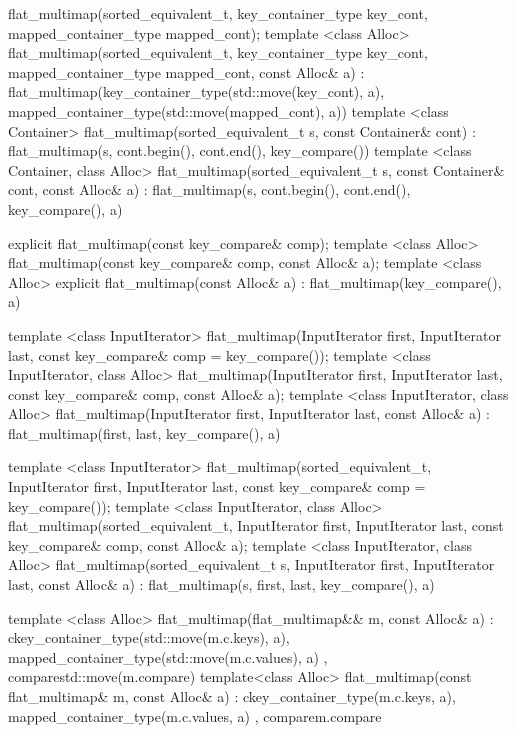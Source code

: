 \begin{codeblock}
\begin{codeblock}
\begin{codeblock}
\begin{addedblock}
\begin{codeblock}
{{      flat_multimap(sorted_equivalent_t,
                    key_container_type key_cont, mapped_container_type mapped_cont);
      template <class Alloc>
      flat_multimap(sorted_equivalent_t, key_container_type key_cont,
                    mapped_container_type mapped_cont, const Alloc& a)
          : flat_multimap(key_container_type(std::move(key_cont), a),
                          mapped_container_type(std::move(mapped_cont), a))
        { }
      template <class Container>
        flat_multimap(sorted_equivalent_t s, const Container& cont)
          : flat_multimap(s, cont.begin(), cont.end(), key_compare()) { }
      template <class Container, class Alloc>
        flat_multimap(sorted_equivalent_t s, const Container& cont, const Alloc& a)
          : flat_multimap(s, cont.begin(), cont.end(), key_compare(), a) { }

      explicit flat_multimap(const key_compare& comp);
      template <class Alloc>
        flat_multimap(const key_compare& comp, const Alloc& a);
      template <class Alloc>
        explicit flat_multimap(const Alloc& a)
          : flat_multimap(key_compare(), a) { }

      template <class InputIterator>
        flat_multimap(InputIterator first, InputIterator last,
                      const key_compare& comp = key_compare());
      template <class InputIterator, class Alloc>
        flat_multimap(InputIterator first, InputIterator last,
                     const key_compare& comp, const Alloc& a);
      template <class InputIterator, class Alloc>
        flat_multimap(InputIterator first, InputIterator last,
                      const Alloc& a)
          : flat_multimap(first, last, key_compare(), a) { }

      template <class InputIterator>
        flat_multimap(sorted_equivalent_t, InputIterator first, InputIterator last,
                      const key_compare& comp = key_compare());
      template <class InputIterator, class Alloc>
        flat_multimap(sorted_equivalent_t, InputIterator first, InputIterator last,
                      const key_compare& comp, const Alloc& a);
      template <class InputIterator, class Alloc>
        flat_multimap(sorted_equivalent_t s, InputIterator first, InputIterator last,
                      const Alloc& a)
          : flat_multimap(s, first, last, key_compare(), a) { }

      template <class Alloc>
        flat_multimap(flat_multimap&& m, const Alloc& a)
          : c{key_container_type(std::move(m.c.keys), a),
              mapped_container_type(std::move(m.c.values), a)}
          , compare{std::move(m.compare)}
        { }
      template<class Alloc>
        flat_multimap(const flat_multimap& m, const Alloc& a)
          : c{key_container_type(m.c.keys, a), mapped_container_type(m.c.values, a)}
          , compare{m.compare}
        { }

}}
\end{codeblock}
\end{addedblock}
\end{codeblock}
\end{codeblock}
\end{codeblock}
